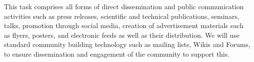 \begin{task}[
  title=Dissemination and communication activities,
  id=Website,
  lead=SRL,
  PM=2,
  wphases={0-36!.027},
  partners={MP,QS}
]

This task comprises all forms of direct dissemination and public communication
activities such as press releases, scientific and technical publications, seminars, 
talks, promotion through social media,
creation of advertisement materials such as flyers, posters, and electronic
feeds as well as their distribution. We will use standard community building
technology such as mailing lists, Wikis and Forums, to ensure dissemination and
engagement of the community to support this.

\end{task}
